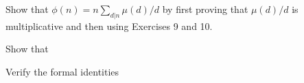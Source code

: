 \documentclass[english]{IMTexam}
\begin{document}
\begin{questions}
		\begin{solution}
			
		\end{solution}
		
		\question\label{ques:IR:2.11} Show that $ \phi(n)=n\sum_{d|n} \mu(d)/d $ by first proving that $ \mu(d)/d $ is multiplicative and then using Exercises 9 and 10.
		
		\begin{solution}
			
		\end{solution}
		
		\question\label{ques:IR:2.15} Show that
		
		\question\label{ques:IR:2.26} Verify the formal identities
\end{questions}
\end{document}
